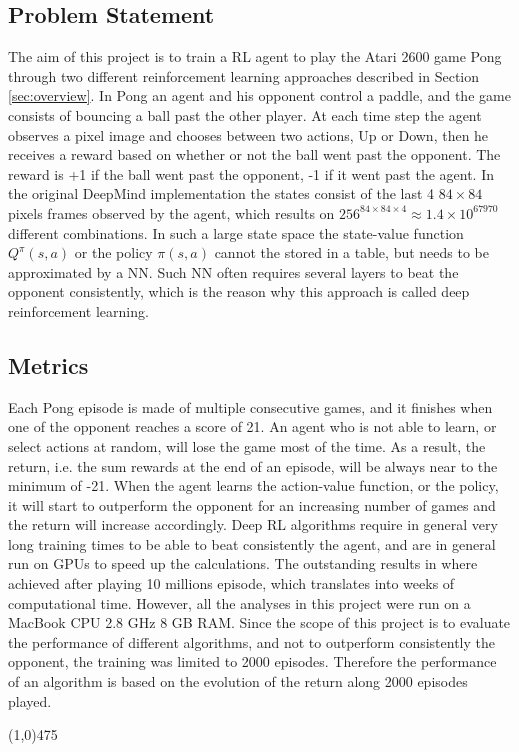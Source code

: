 \documentclass[a4paper, 11pt]{article}
\newcommand{\hl}{\begin{center} \line(1,0){475} \end{center}} %
\begin{document}
\subsection{Problem Statement}
The aim of this project is to train a RL agent to play the Atari 2600 game Pong \cite{OpenAI} through two different reinforcement learning approaches described in Section \ref{sec:overview}. In Pong an agent and his opponent control a paddle, and the game consists of bouncing a ball past the other player. At each time step the agent observes a pixel image and chooses between two actions, Up or Down, then he receives a reward based on whether or not the ball went past the opponent. The reward is +1 if the ball went past the opponent, -1 if it went past the agent. In the original DeepMind implementation \cite{Mnih2013,Mnih2016} the states consist of the last 4 $84 \times 84$ pixels frames observed by the agent, which results on $256^{84 \times 84 \times 4} \approx 1.4 \times 10^{67970}$ different combinations. In such a large state space the state-value function $Q^{\pi}(s,a) $ or the policy  $\pi(s,a)$ cannot the stored in a table, but needs to be approximated by a NN. Such NN often requires several layers to beat the opponent consistently, which is the reason why this approach is called deep reinforcement learning.

\subsection{Metrics}
Each Pong episode is made of multiple consecutive games, and it finishes when one of the opponent reaches a score of 21. An agent who is not able to learn, or select actions at random, will lose the game most of the time. As a result, the return, i.e. the sum rewards at the end of an episode, will be always near to the minimum of -21. When the agent learns the action-value function, or the policy, it will start to outperform the opponent for an increasing number of games and the return will increase accordingly. Deep RL algorithms require in general very long training times to be able to beat consistently the agent, and are in general run on GPUs to speed up the calculations. The outstanding results in \cite{Mnih2016} where achieved after playing 10 millions episode, which translates into weeks of computational time. However, all the analyses in this project were run on a MacBook CPU 2.8 GHz 8 GB RAM. Since the scope of this project is to evaluate the performance of different algorithms, and not to outperform consistently the opponent, the training was limited to 2000 episodes. Therefore the performance of an algorithm is based on the evolution of the return along 2000 episodes played.
\hl
\end{document}
